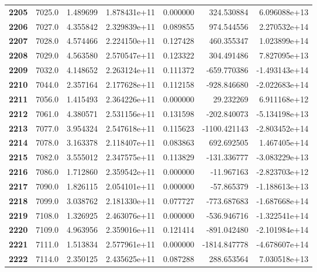 \documentclass{report}[12pt]
\begin{document}
\begin{center}
\begin{tabular}{lrrrrrr}
\textbf{2205} &         7025.0 &   1.489699 &  1.878431e+11 &    0.000000 &   324.530884 &  6.096088e+13 \\
\textbf{2206} &         7027.0 &   4.355842 &  2.329839e+11 &    0.089855 &   974.544556 &  2.270532e+14 \\
\textbf{2207} &         7028.0 &   4.574466 &  2.224150e+11 &    0.127428 &   460.355347 &  1.023899e+14 \\
\textbf{2208} &         7029.0 &   4.563580 &  2.570547e+11 &    0.123322 &   304.491486 &  7.827095e+13 \\
\textbf{2209} &         7032.0 &   4.148652 &  2.263124e+11 &    0.111372 &  -659.770386 & -1.493143e+14 \\
\textbf{2210} &         7044.0 &   2.357164 &  2.177628e+11 &    0.112158 &  -928.846680 & -2.022683e+14 \\
\textbf{2211} &         7056.0 &   1.415493 &  2.364226e+11 &    0.000000 &    29.232269 &  6.911168e+12 \\
\textbf{2212} &         7061.0 &   4.380571 &  2.531156e+11 &    0.131598 &  -202.840073 & -5.134198e+13 \\
\textbf{2213} &         7077.0 &   3.954324 &  2.547618e+11 &    0.115623 & -1100.421143 & -2.803452e+14 \\
\textbf{2214} &         7078.0 &   3.163378 &  2.118407e+11 &    0.083863 &   692.692505 &  1.467405e+14 \\
\textbf{2215} &         7082.0 &   3.555012 &  2.347575e+11 &    0.113829 &  -131.336777 & -3.083229e+13 \\
\textbf{2216} &         7086.0 &   1.712860 &  2.359542e+11 &    0.000000 &   -11.967163 & -2.823703e+12 \\
\textbf{2217} &         7090.0 &   1.826115 &  2.054101e+11 &    0.000000 &   -57.865379 & -1.188613e+13 \\
\textbf{2218} &         7099.0 &   3.038762 &  2.181330e+11 &    0.077727 &  -773.687683 & -1.687668e+14 \\
\textbf{2219} &         7108.0 &   1.326925 &  2.463076e+11 &    0.000000 &  -536.946716 & -1.322541e+14 \\
\textbf{2220} &         7109.0 &   4.963956 &  2.359016e+11 &    0.121414 &  -891.042480 & -2.101984e+14 \\
\textbf{2221} &         7111.0 &   1.513834 &  2.577961e+11 &    0.000000 & -1814.847778 & -4.678607e+14 \\
\textbf{2222} &         7114.0 &   2.350125 &  2.435625e+11 &    0.087288 &   288.653564 &  7.030518e+13 \\

\end{tabular}
\end{center}
\end{document}
